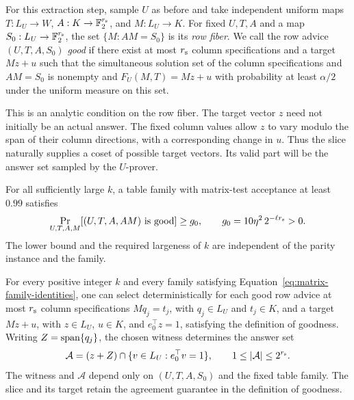 For this extraction step, sample $U$ as before and take independent uniform
maps $T:L_U\to W$, $A:K\to\mathbb F_2^{r_{\rm s}}$, and $M:L_U\to K$.
For fixed $U,T,A$ and a map
$S_0:L_U\to\mathbb F_2^{r_{\rm s}}$, the set $\{M:AM=S_0\}$ is its
\emph{row fiber}.  We call the row advice $(U,T,A,S_0)$ \emph{good} if there exist
at most $r_{\rm s}$ column specifications and a target $Mz+u$ such that
the simultaneous solution set of the column specifications and $AM=S_0$
is nonempty and $F_U(M,T)=Mz+u$ with probability at least $\alpha/2$
under the uniform measure on this set.

This is an analytic condition on the row fiber.  The target vector $z$
need not initially be an actual answer.  The fixed column values allow
$z$ to vary modulo the span of their column directions, with a corresponding
change in $u$.  Thus the slice naturally supplies a coset of possible
target vectors.  Its valid part will be the answer set sampled by the
$U$-prover.

\begin{lemma}
\label{lem:good-row-advice}
For all sufficiently large $k$, a table family with matrix-test acceptance at
least $0.99$ satisfies
\begin{equation}
 \Pr_{U,T,A,M}[(U,T,A,AM)\text{ is good}]
 \ge g_0,
 \qquad
 g_0=10\eta^2\,2^{-\ell r_{\rm s}}>0.
 \label{eq:good-advice-mass}
\end{equation}
The lower bound and the required largeness of $k$ are independent of the
parity instance and the family.

For every positive integer $k$ and every family satisfying
Equation~\eqref{eq:matrix-family-identities}, one can select deterministically
for each good row advice at most $r_{\rm s}$ column specifications
$Mq_j=t_j$, with $q_j\in L_U$ and $t_j\in K$, and a target $Mz+u$,
with $z\in L_U$, $u\in K$, and $e_0^\top z=1$, satisfying the definition
of goodness.
Writing $Z=\operatorname{span}\{q_j\}$, the chosen witness determines the answer set
\begin{equation}
 \mathcal A=(z+Z)\cap\{v\in L_U:e_0^\top v=1\},
 \qquad 1\le |\mathcal A|\le 2^{r_{\rm s}}.
 \label{eq:row-answer-set}
\end{equation}
The witness and $\mathcal A$ depend only on $(U,T,A,S_0)$ and the fixed
table family.  The slice and its target retain the agreement guarantee in
the definition of goodness.
\end{lemma}

